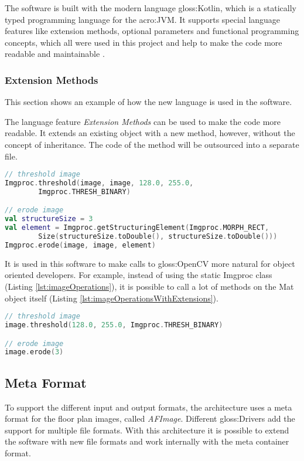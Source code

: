 The software is built with the modern language \gls{gloss:Kotlin}, which is a statically typed programming language for the \acrfull{acro:JVM}. It supports special language features like extension methods, optional parameters and functional programming concepts, which all were used in this project and help to make the code more readable and maintainable \citep{kotlin}.

\subsubsection{Extension Methods}
This section shows an example of how the new language is used in the software.

The language feature \textit{Extension Methods} can be used to make the code more readable. It extends an existing object with a new method, however, without the concept of inheritance. The code of the method will be outsourced into a separate file.

\begin{lstlisting}[caption={Erode image without extension methods},label={lst:imageOperations},language=Kotlin]
// threshold image
Imgproc.threshold(image, image, 128.0, 255.0, 
		Imgproc.THRESH_BINARY)

// erode image
val structureSize = 3
val element = Imgproc.getStructuringElement(Imgproc.MORPH_RECT, 
        Size(structureSize.toDouble(), structureSize.toDouble()))
Imgproc.erode(image, image, element)
\end{lstlisting}

It is used in this software to make calls to \gls{gloss:OpenCV} more natural for object oriented developers. For example, instead of using the static Imgproc class (Listing \ref{lst:imageOperations}), it is possible to call a lot of methods on the Mat object itself (Listing \ref{lst:imageOperationsWithExtensions}).

\begin{lstlisting}[caption={Erode image with extension methods},label={lst:imageOperationsWithExtensions},language=Kotlin]
// threshold image
image.threshold(128.0, 255.0, Imgproc.THRESH_BINARY)

// erode image
image.erode(3)
\end{lstlisting}

\subsection{Meta Format}
\label{sub:MetaFormat}
To support the different input and output formats, the architecture uses a meta format for the
floor plan images, called \textit{AFImage}. Different \gls{gloss:Drivers} add the support for multiple file formats. With this architecture it is possible to extend the software with new file formats and work internally with the meta container format.

